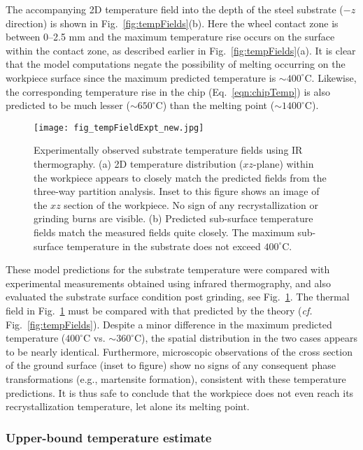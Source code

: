 \documentclass[11pt]{article}
\begin{document}
The accompanying 2D temperature field into the depth of the steel substrate ($-z$ direction) is shown in Fig.~\ref{fig:tempFields}(b). Here the wheel contact zone is between 0--2.5 mm and the maximum temperature rise occurs on the surface within the contact zone, as described earlier in Fig.~\ref{fig:tempFields}(a). It is clear that the model computations negate the possibility of melting occurring on the workpiece surface since the maximum predicted temperature is $\sim 400^\circ$C. Likewise, the corresponding temperature rise in the chip (Eq.~\ref{eqn:chipTemp}) is also predicted to be much lesser ($\sim 650^\circ$C) than the melting point ($\sim 1400^\circ$C). 


\begin{figure}
   \centering
  \texttt{[image: fig\_tempFieldExpt\_new.jpg]}
  \caption{Experimentally observed substrate temperature fields using IR thermography. (a) 2D temperature distribution ($xz$-plane) within the workpiece appears to closely match the predicted fields from the three-way partition analysis. Inset to this figure shows an image of the $xz$ section of the workpiece. No sign of any recrystallization or grinding burns are visible. (b) Predicted sub-surface temperature fields match the measured fields quite closely. The maximum sub-surface temperature in the substrate does not exceed $400^\circ$C. }
  \label{fig:tempFieldExpt}
\end{figure}

These model predictions for the substrate temperature were compared with experimental measurements obtained using infrared thermography, and also evaluated the substrate surface condition post grinding, see Fig.~\ref{fig:tempFieldExpt}. The thermal field in Fig.~\ref{fig:tempFieldExpt} must be compared with that predicted by the theory (\emph{cf.} Fig.~\ref{fig:tempFields}). Despite a minor difference in the maximum predicted temperature ($400^\circ$C vs. $\sim 360^\circ$C), the spatial distribution in the two cases appears to be nearly identical. Furthermore, microscopic observations of the cross section of the ground surface (inset to figure) show no signs of any consequent phase transformations (e.g., martensite formation), consistent with these temperature predictions. It is thus safe to conclude that the workpiece does not even reach its recrystallization temperature, let alone its melting point.

\subsubsection{Upper-bound temperature estimate}
\end{document}
